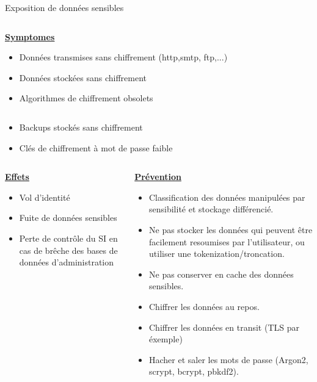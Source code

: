 \documentclass[final,hyperref={pdfpagelabels=false}]{beamer}
\begin{document}
\begin{frame}[t]
\begin{columns}[t]
\begin{column}{.465\textwidth}
\begin{block}{Exposition de données sensibles}
\begin{columns}[T]
		\begin{column}{.875\textwidth}
			\uline{\uline{\textbf{Symptomes}}}
			\begin{itemize}
				\item Données transmises sans chiffrement (http,smtp, ftp,...)
				\item Données stockées sans chiffrement
				\item Algorithmes de chiffrement obsolets 
			\end{itemize}
		\end{column}
	\end{columns}
	\begin{itemize}
		\item Backups stockés sans chiffrement 
		\item Clés de chiffrement à mot de passe faible
	\end{itemize}
	\begin{columns}[T]
		\begin{column}{0.5\textwidth}
			\vfill
			\uline{\textbf{Effets}}
			\begin{itemize}
				\item Vol d'identité
				\item Fuite de données sensibles
				\item Perte de contrôle du SI en cas de brêche des bases de données d'administration
			\end{itemize}
			\vfill
		\end{column}
		\begin{column}{0.5\textwidth}
			\vfill
			\uline{\textbf{Prévention}}
			\begin{itemize}
				\item Classification des données manipulées par sensibilité et stockage différencié.
				\item Ne pas stocker les données qui peuvent être facilement resoumises par l'utilisateur, ou utiliser une tokenization/troncation.
				\item Ne pas conserver en cache des données sensibles.
				\item Chiffrer les données au repos.
				\item Chiffrer les données en transit (TLS par éxemple)
				\item Hacher et saler les mots de passe (Argon2, scrypt, bcrypt, pbkdf2).
			\end{itemize}
		\end{column}
	\end{columns}




\end{block}
\end{column}
\end{columns}
\end{frame}
\end{document}

